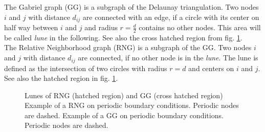     The Gabriel graph (GG) \cite{Gabriel1969} is a subgraph of the
    Delaunay triangulation. Two nodes \(i\) and \(j\) with distance
    \(d_{ij}\) are connected with an edge, if a circle with its
    center on half way between \(i\) and \(j\) and radius
    \(r = \frac d 2\) contains no other nodes. This area will be
    called \emph{lune} in the following. See also the cross hatched region
    from fig. \ref{fig:lunes}.\\
    The Relative Neighborhood graph (RNG) \cite{Toussaint1980} is a
    subgraph of the GG. Two nodes \(i\) and \(j\) with
    distance \(d_{ij}\) are connected, if no other node is in the
    \emph{lune}. The lune is defined as the intersection of two
    circles with radius \(r = d\) and centers on \(i\) and \(j\).
    See also the hatched region in fig. \ref{fig:lunes}.
    \begin{figure}[htbp]
        \centering
        \caption[Gabriel - and Relative Neighborhood Graph]
        {
             Lunes of RNG (hatched region) and
                GG (cross hatched region)
             Example of a RNG on periodic
                boundary conditions. Periodic nodes are dashed.
             Example of a GG on
                periodic boundary conditions. Periodic nodes are dashed.
        }
        \label{fig:lunes}
    \end{figure}\\
